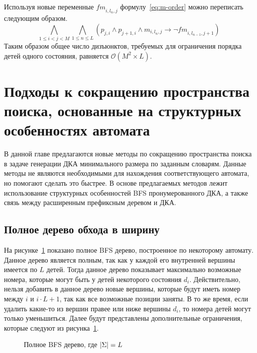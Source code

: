 Используя новые переменные $\mathit{fm}_{i,l_{n},j}$ формулу~\eqref{eq:m-order} можно переписать следующим образом.
%
\begin{equation}
\label{eq:m-order-tight}
  \bigwedge_{1 \leq i < j < M} \bigwedge_{1 \leq n \leq L} \left(p_{j,i} \wedge p_{j + 1, i} \wedge m_{i,l_{n}, j} \rightarrow \neg \mathit{fm}_{i, l_{n - 1}, j + 1}\right)
\end{equation}
%
Таким образом общее число дизъюнктов, требуемых для ограничения порядка детей одного состояния, равняется $\mathcal{O}\left(M^{2} \times L\right)$. 


\section{Подходы к сокращению пространства поиска, основанные на структурных особенностях автомата} 
\label{sec:space:pruning}

В данной главе предлагаются новые методы по сокращению пространства поиска в задаче генерации ДКА минимального размера по заданным словарям. 
Данные методы не являются необходимыми для нахождения соответствующего автомата, но помогают сделать это быстрее.
В основе предлагаемых методов лежит использование структурных особенностей BFS пронумерованного ДКА, а также связь между расширенным префиксным деревом и ДКА.

\subsection{Полное дерево обхода в ширину}
\label{sec:space:pruning:bfs-tree}

На рисунке~\ref{img:full-bfs} показано полное BFS дерево, построенное по некоторому автомату.
Данное дерево является полным, так как у каждой его внутренней вершины имеется по $L$ детей.
Тогда данное дерево показывает максимально возможные номера, которые могут быть у детей некоторого состояния $d_{i}$.
Действительно, нельзя добавить в данное дерево новые вершины, которые будут иметь номер между $i$ и $i \cdot L + 1$, так как все возможные позиции заняты.
В то же время, если удалить какие-то из вершин правее или ниже вершины $d_{i}$, то номера детей могут только уменьшиться.
Далее будут представлены дополнительные ограничения, которые следуют из рисунка~\ref{img:full-bfs}.

\begin{figure}[ht]
  \centering
  \scalebox{0.625}{}
  \caption{Полное BFS дерево, где $\lvert\Sigma\rvert=L$}
  \label{img:full-bfs}
\end{figure}

